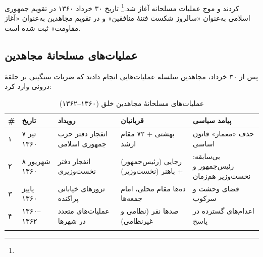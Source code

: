 
کردند و موج عملیات مسلحانه آغاز شد.\footnote{} تاریخ ۳۰ خرداد ۱۳۶۰ در تقویم جمهوری اسلامی به‌عنوان «سالروز شکست فتنهٔ منافقین» و در تقویم مجاهدین به‌عنوان «آغاز مقاومت» ثبت شده است.

\subsection{عملیات‌های مسلحانهٔ مجاهدین}

پس از ۳۰ خرداد، مجاهدین سلسله عملیات‌هایی انجام دادند که ضربات سنگینی بر حلقهٔ درونی وارد کرد:

\begin{longtable}{%
    >{\centering\arraybackslash}p{}
    >{\raggedleft\arraybackslash}p{}
    >{\raggedleft\arraybackslash}p{}
    >{\raggedleft\arraybackslash}p{}
    >{\raggedleft\arraybackslash}p{}}
\toprule
\rowcolor{cAccent!10}
\textbf{\#} & \textbf{تاریخ} & \textbf{رویداد} & \textbf{قربانیان} & \textbf{پیامد سیاسی} \\
\midrule
\endhead

۱ &
۷ تیر ۱۳۶۰ &
انفجار دفتر حزب جمهوری اسلامی &
بهشتی + ۷۲ مقام ارشد &
حذف «معمار» قانون اساسی \\
\midrule

۲ &
۸ شهریور ۱۳۶۰ &
انفجار دفتر نخست‌وزیری &
رجایی (رئیس‌جمهور) + باهنر (نخست‌وزیر) &
بی‌سابقه: رئیس‌جمهور و نخست‌وزیر هم‌زمان \\
\midrule

۳ &
پاییز ۱۳۶۰ &
ترورهای خیابانی پراکنده &
ده‌ها مقام محلی، امام جمعه‌ها &
فضای وحشت و سرکوب \\
\midrule

۴ &
۱۳۶۰–۱۳۶۲ &
عملیات‌های متعدد در شهرها &
صدها نفر (نظامی و غیرنظامی) &
اعدام‌های گسترده در پاسخ \\

\bottomrule
\caption{عملیات‌های مسلحانهٔ مجاهدین خلق (۱۳۶۰–۱۳۶۲)}
\label{tab:mek-operations}
\end{longtable}

